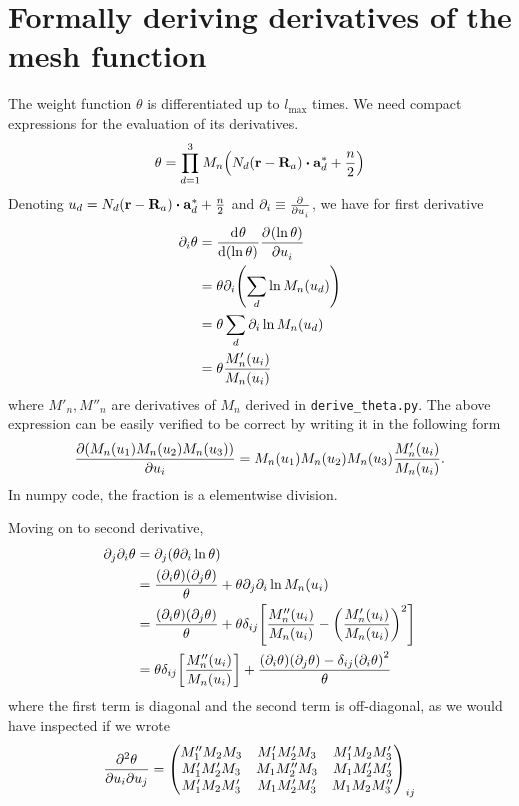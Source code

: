 \documentclass[12pt]{extarticle}
\renewcommand{\bf}{\mathbf}
\begin{document}
    \section{Formally deriving derivatives of the mesh function}
    The weight function \(\theta\) is differentiated up to \(l_\text{max}\) times. We need compact expressions for the evaluation of its derivatives. 
    \[
        \theta = \prod_{d = 1}^3 M_n \pqty{ N_d ( \mathbf r - \mathbf R_a) \dotproduct \bf a^*_d + \frac{n}{2} }
    \]
    Denoting \(u_d = N_d ( \mathbf r - \mathbf R_a) \dotproduct \bf a^*_d + \frac{n}{2} \) and \(\partial_i \equiv \pdv[]{}{u_i}\), we have for first derivative
    \begin{align*}
        \partial_i \theta &= \dv[]{\theta}{(\ln \theta)} \pdv[]{(\ln \theta)}{u_i}\\
        &= \theta \partial_i \pqty{\sum_d \ln M_n(u_d) }\\
        &= \theta \sum_d \partial_i \ln M_n(u_d) \\
        &= \theta \frac{M'_n(u_i)}{M_n(u_i)} 
    \end{align*}
    where \(M'_n, M''_n\) are derivatives of \(M_n\) derived in \texttt{derive\_theta.py}. The above expression can be easily verified to be correct by writing it in the following form \[
        \pdv{(M_n(u_1) M_n(u_2) M_n(u_3))}{u_i} = M_n(u_1) M_n(u_2) M_n(u_3) \frac{M'_n (u_i)}{M_n(u_i)}.
    \]
    In numpy code, the fraction is a elementwise division.
    
    Moving on to second derivative, \begin{align*}
        \partial_j \partial_i \theta &= \partial_j \pqty{\theta \partial_i \ln \theta}\\
        &= \frac{\pqty{\partial_i \theta} \pqty{\partial_j \theta}}{\theta} + \theta \partial_j \partial_i \ln M_n (u_i)\\
        &= \frac{\pqty{\partial_i \theta} \pqty{\partial_j \theta}}{\theta} + \theta \delta_{ij} \bqty{\frac{M''_n (u_i)}{M_n(u_i)} - \pqty{\frac{M'_n(u_i)}{M_n(u_i)} }^2}\\
        &= \theta \delta_{ij} \bqty{\frac{M''_n (u_i)}{M_n(u_i)} } + \frac{\pqty{\partial_i \theta} \pqty{\partial_j \theta} - \delta_{ij} \pqty{\partial_i \theta}^2 }{\theta} 
    \end{align*}
    where the first term is diagonal and the second term is off-diagonal, as we would have inspected if we wrote \[
        \pdv{\theta}{u_i}{u_j} = \begin{pmatrix} 
            M''_1 M_2 M_3 & M'_1 M'_2 M_3 & M'_1 M_2 M'_3\\
            M'_1 M'_2 M_3 & M_1 M''_2 M_3 & M_1 M'_2 M'_3\\
            M'_1 M_2 M'_3 & M_1 M'_2 M'_3 & M_1 M_2 M''_3
        \end{pmatrix}_{ij}
    \]
\end{document}
